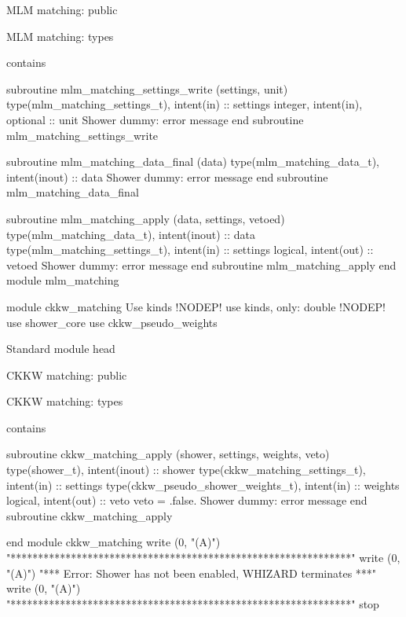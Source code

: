 \LA{}MLM matching: public\RA{}

\LA{}MLM matching: types\RA{}

contains

  subroutine mlm_matching_settings_write (settings, unit)
    type(mlm_matching_settings_t), intent(in) :: settings
    integer, intent(in), optional :: unit
    \LA{}Shower dummy: error message\RA{}
  end subroutine mlm_matching_settings_write

  subroutine mlm_matching_data_final (data)
    type(mlm_matching_data_t), intent(inout) :: data
    \LA{}Shower dummy: error message\RA{}
  end subroutine mlm_matching_data_final

  subroutine mlm_matching_apply (data, settings, vetoed)
    type(mlm_matching_data_t), intent(inout) :: data
    type(mlm_matching_settings_t), intent(in) :: settings
    logical, intent(out) :: vetoed
    \LA{}Shower dummy: error message\RA{}
  end subroutine mlm_matching_apply
end module mlm_matching



module ckkw_matching
\LA{}Use kinds\RA{} !NODEP!
  use kinds, only: double !NODEP!
  use shower_core
  use ckkw_pseudo_weights

\LA{}Standard module head\RA{}

\LA{}CKKW matching: public\RA{}

\LA{}CKKW matching: types\RA{}

contains

  subroutine ckkw_matching_apply (shower, settings, weights, veto)
    type(shower_t), intent(inout) :: shower
    type(ckkw_matching_settings_t), intent(in) :: settings
    type(ckkw_pseudo_shower_weights_t), intent(in) :: weights
    logical, intent(out) :: veto
    veto = .false.
    \LA{}Shower dummy: error message\RA{}
  end subroutine ckkw_matching_apply

end module ckkw_matching
\eatline
\nwendcode{}\nwdocspar
\nwenddocs{}\endmoddef
write (0, "(A)")  "**************************************************************"
write (0, "(A)")  "*** Error: Shower has not been enabled, WHIZARD terminates ***"
write (0, "(A)")  "**************************************************************"
stop
\nwendcode{}\nwdocspar
\nwenddocs{}\nwdocspar
\nwenddocs{}
